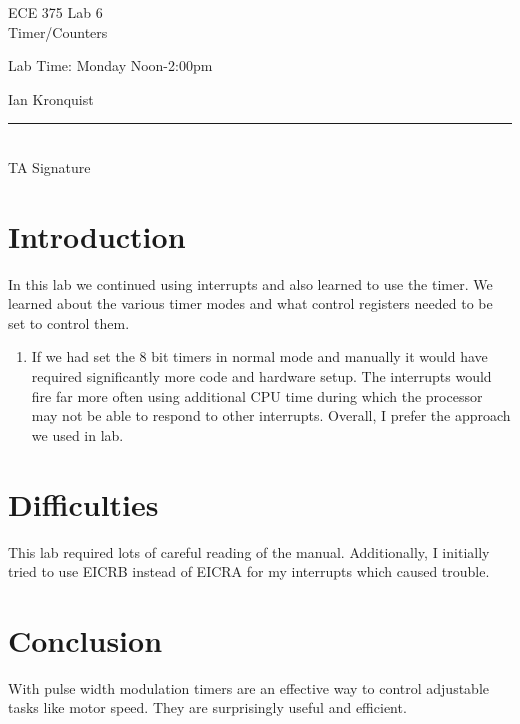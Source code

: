 \documentclass[12pt,letterpaper]{article}
\begin{document}
\begin{titlepage}
    \vspace*{4cm}
    \begin{flushright}
    {\huge
        ECE 375 Lab 6\\[1cm]
    }
    {\large
         Timer/Counters
    }
    \end{flushright}
    \begin{flushleft}
    Lab Time: Monday Noon-2:00pm
    \end{flushleft}
    \begin{flushright}
    Ian Kronquist
    \vfill
    \rule{5in}{.5mm}\\
    TA Signature
    \end{flushright}

\end{titlepage}
\section{Introduction}
In this lab we continued using interrupts and also learned to use the timer. We learned about the various timer modes and what control registers needed to be set to control them.

\begin{enumerate}

\item If we had set the 8 bit timers in normal mode and manually it would have required significantly more code and hardware setup. The interrupts would fire far more often using additional CPU time during which the processor may not be able to respond to other interrupts. Overall, I prefer the approach we used in lab.

\end{enumerate}

\section{Difficulties}
This lab required lots of careful reading of the manual. Additionally, I initially tried to use EICRB instead of EICRA for my interrupts which caused trouble.

\section{Conclusion}
With pulse width modulation timers are an effective way to control adjustable tasks like motor speed. They are surprisingly useful and efficient.
\end{document}
